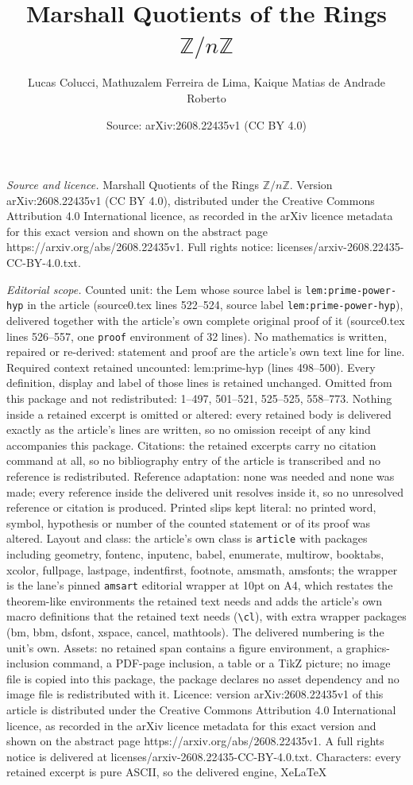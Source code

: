 \documentclass[10pt,a4paper]{amsart}
\title[Marshall Quotients of the Rings $\mathbb Z/n\mathbb Z$]{Marshall Quotients of the Rings $\mathbb Z/n\mathbb Z$}
\author{Lucas Colucci, Mathuzalem Ferreira de Lima, Kaique Matias de Andrade Roberto}
\date{Source: arXiv:2608.22435v1 (CC BY 4.0)}
\begin{document}
\maketitle

\noindent\emph{Source and licence.} Marshall Quotients of the Rings $\mathbb Z/n\mathbb Z$. Version arXiv:2608.22435v1 (CC BY 4.0), distributed under the Creative Commons Attribution 4.0 International licence, as recorded in the arXiv licence metadata for this exact version and shown on the abstract page https://arxiv.org/abs/2608.22435v1. Full rights notice: licenses/arxiv-2608.22435-CC-BY-4.0.txt.\par\smallskip

\noindent\textit{Editorial scope.} Counted unit: the Lem whose source label is \texttt{lem:prime-power-hyp} in the article (source0.tex lines 522--524, source label \texttt{lem:prime-power-hyp}), delivered together with the article's own complete original proof of it (source0.tex lines 526--557, one \texttt{proof} environment of 32 lines). No mathematics is written, repaired or re-derived: statement and proof are the article's own text line for line. Required context retained uncounted: lem:prime-hyp (lines 498--500). Every definition, display and label of those lines is retained unchanged. Omitted from this package and not redistributed: 1--497, 501--521, 525--525, 558--773. Nothing inside a retained excerpt is omitted or altered: every retained body is delivered exactly as the article's lines are written, so no omission receipt of any kind accompanies this package. Citations: the retained excerpts carry no citation command at all, so no bibliography entry of the article is transcribed and no reference is redistributed. Reference adaptation: none was needed and none was made; every reference inside the delivered unit resolves inside it, so no unresolved reference or citation is produced. Printed slips kept literal: no printed word, symbol, hypothesis or number of the counted statement or of its proof was altered. Layout and class: the article's own class is \texttt{article} with packages including geometry, fontenc, inputenc, babel, enumerate, multirow, booktabs, xcolor, fullpage, lastpage, indentfirst, footnote, amsmath, amsfonts; the wrapper is the lane's pinned \texttt{amsart} editorial wrapper at 10pt on A4, which restates the theorem-like environments the retained text needs and adds the article's own macro definitions that the retained text needs (\texttt{\textbackslash cl}), with extra wrapper packages (bm, bbm, dsfont, xspace, cancel, mathtools). The delivered numbering is the unit's own. Assets: no retained span contains a figure environment, a graphics-inclusion command, a PDF-page inclusion, a table or a TikZ picture; no image file is copied into this package, the package declares no asset dependency and no image file is redistributed with it. Licence: version arXiv:2608.22435v1 of this article is distributed under the Creative Commons Attribution 4.0 International licence, as recorded in the arXiv licence metadata for this exact version and shown on the abstract page https://arxiv.org/abs/2608.22435v1. A full rights notice is delivered at licenses/arxiv-2608.22435-CC-BY-4.0.txt. Characters: every retained excerpt is pure ASCII, so the delivered engine, XeLaTeX 
\end{document}

